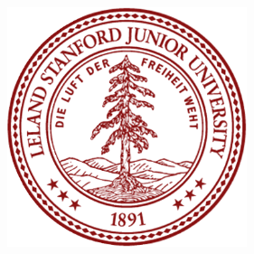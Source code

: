 \documentclass[landscape,a0b,final]{a0poster}
\newenvironment{poster}{
  \begin{center}
  \begin{minipage}[c]{0.98\textwidth}
}{
  \end{minipage}
  \end{center}
}
\newenvironment{pcolumn}[1]{
  \begin{minipage}{#1\textwidth}
  \begin{center}
}{
  \end{center}
  \end{minipage}
}
\begin{document}
\begin{poster}
\begin{center}
\begin{pcolumn}{0.98}
{\begin{minipage}[c][9cm][c]{0.1\textwidth}
\begin{center}
    \includegraphics[width=7cm,angle=0]{figures/stanfordlogo.eps}
  \end{center}
\end{minipage}

}
\end{pcolumn}
\end{center}


\vspace*{1.5cm}
\newcommand{\R}{\textbf{R}}
\newcommand{\N}{\mathcal{N}}


\end{poster}
\end{document}
